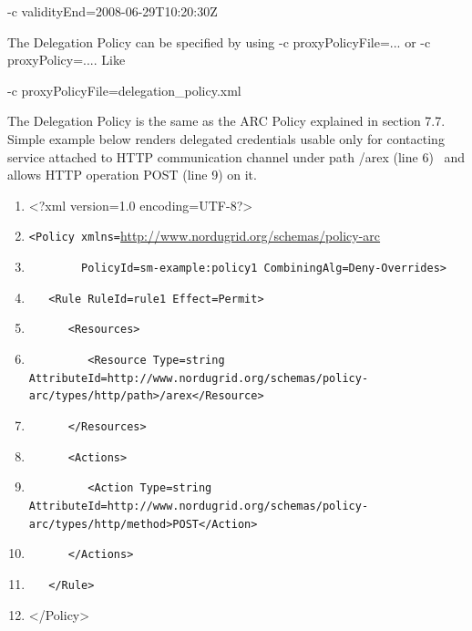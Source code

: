 \documentclass{article}
\newcommand\liststyleWWviiiNumxv{%
\renewcommand\theenumi{\arabic{enumi}}
\renewcommand\theenumii{\arabic{enumii}}
\renewcommand\theenumiii{\arabic{enumiii}}
\renewcommand\theenumiv{\arabic{enumiv}}
\renewcommand\labelenumi{\theenumi.}
\renewcommand\labelenumii{\theenumii.}
\renewcommand\labelenumiii{\theenumiii.}
\renewcommand\labelenumiv{\theenumiv.}
}
\begin{document}
{\color{black}
{}-c validityEnd=2008-06-29T10:20:30Z}

{\color{black}
The Delegation Policy can be specified by using {\textquotedbl}-c
proxyPolicyFile=...{\textquotedbl} or {\textquotedbl}-c
proxyPolicy=...{\textquotedbl}. Like }

{\color{black}
{}-c proxyPolicyFile=delegation\_policy.xml}

{\upshape\color{black}
The Delegation Policy is the same as the ARC Policy explained in section
7.7. Simple example below renders delegated credentials usable only for
contacting service attached to HTTP communication channel under path
/arex (line 6) \ and allows HTTP operation POST (line 9) on it. }

\liststyleWWviiiNumxv
\begin{enumerate}
\item {\ttfamily\color{black}
{\textless}?xml version={\textquotedbl}1.0{\textquotedbl}
encoding={\textquotedbl}UTF-8{\textquotedbl}?{\textgreater}}
\item {\color{black}
\texttt{{\textless}Policy
xmlns={\textquotedbl}}\url{http://www.nordugrid.org/schemas/policy-arc}\texttt{{\textquotedbl}}}
\item {\color{black}
\texttt{\ \ \ \ \ \ \ \ PolicyId={\textquotedbl}sm-example:policy1{\textquotedbl}
CombiningAlg={\textquotedbl}Deny-Overrides{\textquotedbl}{\textgreater}}}
\item {\color{black}
\texttt{\ \ \ {\textless}Rule RuleId={\textquotedbl}rule1{\textquotedbl}
Effect={\textquotedbl}Permit{\textquotedbl}{\textgreater}}}
\item {\color{black}
\texttt{\ \ \ \ \ \ {\textless}Resources{\textgreater}}}
\item {\color{black}
\texttt{\ \ \ \ \ \ \ \ \ {\textless}Resource
Type={\textquotedbl}string{\textquotedbl}
AttributeId={\textquotedbl}http://www.nordugrid.org/schemas/policy-arc/types/http/path{\textquotedbl}{\textgreater}/arex{\textless}/Resource{\textgreater}}}
\item {\color{black}
\texttt{\ \ \ \ \ \ {\textless}/Resources{\textgreater}}}
\item {\color{black}
\texttt{\ \ \ \ \ \ {\textless}Actions{\textgreater}}}
\item {\color{black}
\texttt{\ \ \ \ \ \ \ \ \ {\textless}Action
Type={\textquotedbl}string{\textquotedbl}
AttributeId={\textquotedbl}http://www.nordugrid.org/schemas/policy-arc/types/http/method{\textquotedbl}{\textgreater}POST{\textless}/Action{\textgreater}}}
\item {\color{black}
\texttt{\ \ \ \ \ \ {\textless}/Actions{\textgreater}}}
\item {\color{black}
\texttt{\ \ \ {\textless}/Rule{\textgreater}}}
\item {\ttfamily\color{black}
{\textless}/Policy{\textgreater}}
\end{enumerate}
\end{document}
